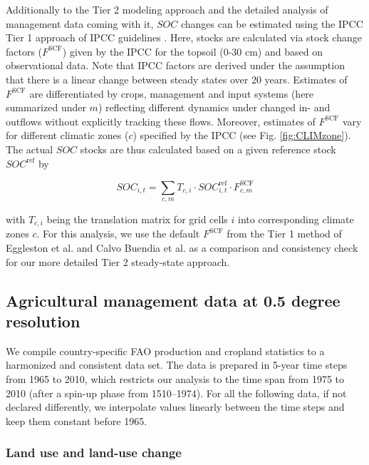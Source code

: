 \documentclass[gc, manuscript]{copernicus}
\begin{document}
Additionally to the Tier 2 modeling approach \citep{ogle_cropland_in_ipcc_2019} and the detailed analysis of management data coming with it, \(SOC\) changes can be estimated using the IPCC Tier 1 approach of IPCC guidelines \citep{eggleston_ipcc_2006, calvo_buendia_ipcc_2019}. Here, stocks are calculated via stock change factors (\(F^{\mathrm{SCF}}\)) given by the IPCC for the topsoil (0-30 cm) and based on observational data. Note that IPCC factors are derived under the assumption that there is a linear change between steady states over 20 years. Estimates of \(F^{\mathrm{SCF}}\) are differentiated by crops, management and input systems (here summarized under \(m\)) reflecting different dynamics under changed in- and outflows without explicitly tracking these flows. Moreover, estimates of \(F^{\mathrm{SCF}}\) vary for different climatic zones (\(c\)) specified by the IPCC (see Fig. \ref{fig:CLIMzone}). The actual \(SOC\) stocks are thus calculated based on a given reference stock \(SOC^{\mathrm{ref}}\) by

\begin{equation}
SOC_{i,t} = \sum_{c,m} T_{c,i} \cdot SOC^{\mathrm{ref}}_{i,t} \cdot F^{\mathrm{SCF}}_{c,m}
\label{eq:tier1}
\end{equation}

with \(T_{c,i}\) being the translation matrix for grid cells \(i\) into corresponding climate zones \(c\). For this analysis, we use the default \(F^{\mathrm{SCF}}\) from the Tier 1 method of Eggleston et al. \citeyearpar{eggleston_ipcc_2006} and Calvo Buendia et al. \citeyearpar{calvo_buendia_ipcc_2019} as a comparison and consistency check for our more detailed Tier 2 steady-state approach.

\hypertarget{sec:agrimanagement}{%
\subsection{Agricultural management data at 0.5 degree resolution}\label{sec:agrimanagement}}

We compile country-specific FAO production and cropland statistics \citep{faostat_faostat_2016} to a harmonized and consistent data set. The data is prepared in 5-year time steps from 1965 to 2010, which restricts our analysis to the time span from 1975 to 2010 (after a spin-up phase from 1510--1974). For all the following data, if not declared differently, we interpolate values linearly between the time steps and keep them constant before 1965.

\hypertarget{sec:landuse}{%
\subsubsection{Land use and land-use change}\label{sec:landuse}}
\end{document}
